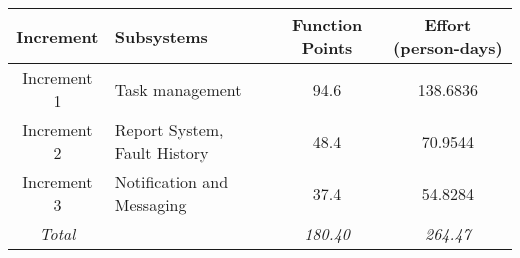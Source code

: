 
\begin{tabular}{c|l|c|c}
\textbf{Increment} & \textbf{Subsystems} & \textbf{Function Points} & \textbf{Effort (person-days)} \\ \hline
Increment 1 & Task management & 94.6 & 138.6836 \\
Increment 2 & Report System, Fault History & 48.4 & 70.9544 \\
Increment 3 & Notification and Messaging & 37.4 & 54.8284 \\ \hline
\textit{Total} &  & \textit{180.40} & \textit{264.47} \\
\end{tabular}